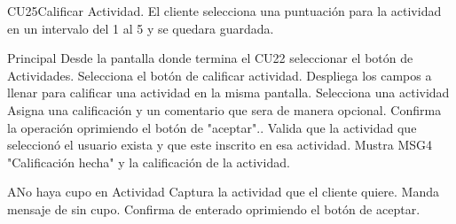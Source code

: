 \begin{UseCase}{CU25}{Calificar Actividad.}{
		El cliente selecciona una puntuación para la actividad en un intervalo del 1 al 5 y se quedara guardada.
	}
\end{UseCase}

\begin{UCtrayectoria}{Principal}
	\UCpaso[\UCactor] Desde la pantalla donde termina el CU22 seleccionar el botón de Actividades.
	\UCpaso[\UCactor] Selecciona el botón de calificar actividad.
	\UCpaso Despliega los campos a llenar para calificar una actividad en la misma pantalla.
	\UCpaso[\UCactor] Selecciona una actividad
	\UCpaso[\UCactor] Asigna una calificación y un comentario que sera de manera opcional.
	\UCpaso[\UCactor] Confirma la operación oprimiendo el botón de "aceptar"..
	\UCpaso Valida que la actividad que seleccionó el usuario exista y que este inscrito en esa actividad.
	\UCpaso Mustra MSG4 "Calificación hecha" y la calificación de la actividad.
	
\end{UCtrayectoria}

\begin{UCtrayectoriaA}{A}{No haya cupo en Actividad}
	\UCpaso Captura la actividad que el cliente quiere.
	\UCpaso[\UCactor] Manda mensaje de sin cupo.
	\UCpaso Confirma de enterado oprimiendo el botón de aceptar.
	\end{UCtrayectoriaA}



